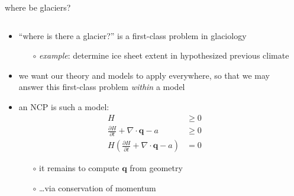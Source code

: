\documentclass[10pt,hyperref,dvipsnames]{beamer}
\newcommand{\bq}{\mathbf{q}}
\newcommand{\Div}{\nabla\cdot}
\begin{document}
\begin{frame}{where be glaciers?}

\begin{columns}
\begin{column}{0.65\textwidth}
\begin{itemize}
\item ``where is there a glacier?'' is a first-class problem in glaciology
    \begin{itemize}
    \item[$\circ$] \emph{example}: determine ice sheet extent in hypothesized previous climate
    \end{itemize}
\item we want our theory and models to apply everywhere, so that we may answer this first-class problem \emph{within} a model
\item an NCP is such a model:
\begin{align*}
H &\ge 0 \\
\frac{\partial H}{\partial t} + \Div \bq - a &\ge 0 \\
H \left(\frac{\partial H}{\partial t} + \Div \bq - a\right) &= 0
\end{align*}
    \begin{itemize}
    \item[$\circ$] it remains to compute $\bq$ from geometry
    \item[$\circ$] \dots via conservation of momentum
    \end{itemize}
\end{itemize}
\end{column}
\begin{column}{0.35\textwidth}

\end{column}
\end{columns}
\end{frame}
\end{document}
